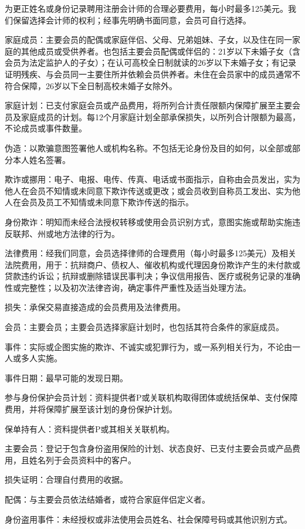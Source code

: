 \documentclass[UTF8,fontset=none,11pt,a4paper]{ctexart}
\begin{document}
为更正姓名或身份记录聘用注册会计师的合理必要费用，每小时最多125美元。我们保留选择会计师的权利；经事先明确书面同意，会员可自行选择。


家庭成员：主要会员的配偶或家庭伴侣、父母、兄弟姐妹、子女，以及住在同一家庭的其他成员或受供养者。也包括主要会员配偶或伴侣的：21岁以下未婚子女（含会员为法定监护人的子女）；在认可高校全日制就读的26岁以下未婚子女；有记录证明残疾、与会员同一主要住所并依赖会员供养者。未住在会员家中的成员通常不符合保障，26岁以下全日制高校未婚子女除外。


家庭计划：已支付家庭会员或产品费用，将所列合计责任限额内保障扩展至主要会员及家庭成员的计划。每12个月家庭计划全部承保损失，以所列合计限额为最高，不论成员或事件数量。


伪造：以欺骗意图签署他人或机构名称。不包括无论身份及目的如何，以全部或部分本人姓名签署。


欺诈或挪用：电子、电报、电传、传真、电话或书面指示，自称由会员发出，实为他人在会员不知情或未同意下欺诈传送或更改；或会员收到自称员工发出、实为他人在会员及员工不知情或未同意下欺诈传送的指示。


身份欺诈：明知而未经合法授权转移或使用会员识别方式，意图实施或帮助实施违反联邦、州或地方法律的行为。


法律费用：经我们同意，会员选择律师的合理费用（每小时最多125美元）及相关法院费用，用于：抗辩商户、债权人、催收机构或代理因身份欺诈产生的未付款或贷款违约诉讼；抗辩或删除错误民事判决；争议信用报告、医疗或税务记录的准确性或完整性；以及初次法律咨询，确定事件严重性及适当处理方法。


损失：承保交易直接造成的会员费用及法律费用。


会员：主要会员；主要会员选择家庭计划时，也包括其符合条件的家庭成员。


事件：实际或企图实施的欺诈、不诚实或犯罪行为，或一系列相关行为，不论由一人或多人实施。


事件日期：最早可能的发现日期。


参与身份保护会员计划：资料提供者P或关联机构取得团体或统括保单、支付保障费用，并将保障扩展至该计划的身份保护计划。


保单持有人：资料提供者P或其相关关联机构。


主要会员：登记于包含身份盗用保险的计划、状态良好、已支付主要会员或产品费用，且姓名列于会员资料中的客户。


损失证明：合理自付费用的收据。


配偶：与主要会员依法结婚者，或符合家庭伴侣定义者。


身份盗用事件：未经授权或非法使用会员姓名、社会保障号码或其他识别方式。
\end{document}
